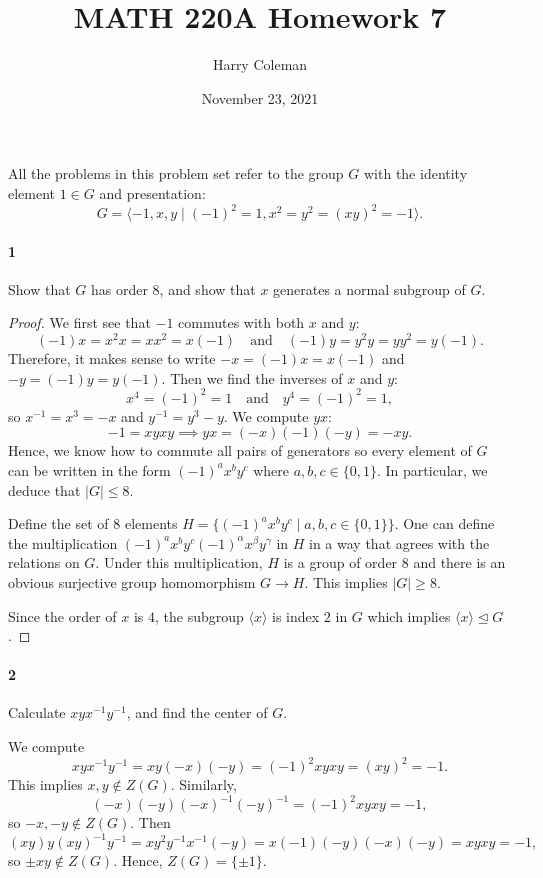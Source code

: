 \documentclass[12pt]{article}
\renewcommand{\maketitle}{\thispagestyle{title}}
\newlength{\myparskip}
\newenvironment{fullbox}{\begin{lrbox}{\savefullbox}\begin{minipage}{\dimexpr\textwidth-2\fboxsep\relax}\setlength{\parskip}{\myparskip}}{\end{minipage}\end{lrbox}\framebox[\textwidth]{\usebox{\savefullbox}}}
\newenvironment{pbox}[1][]{\begin{fullbox}\ifx#1\empty\else\paragraph{#1}\phantom{}\fi}{\end{fullbox}}
\theoremstyle{definition}
\newcommand{\isp}[1]{\quad\text{#1}\quad}
\newcommand{\<}{\langle}
\renewcommand{\>}{\rangle}
\newcommand{\teq}{\trianglelefteq}
\begin{document}
\title{MATH 220A Homework 7}
\author{Harry Coleman\makebox[0pt][r]{\raisebox{-0.25in}[0pt][0pt]{(worked with Joseph Sullivan and Gahl Shemy)}}}
\date{November 23, 2021}
\maketitle

\begin{pbox}
    All the problems in this problem set refer to the group $G$ with the identity element $1 \in G$ and presentation:
    \[
        G = \<-1, x, y \mid (-1)^2 = 1, x^2 = y^2 = (xy)^2 = -1\>.
    \]
\end{pbox}

\begin{pbox}[1]
    Show that $G$ has order $8$, and show that $x$ generates a normal subgroup of $G$.    
\end{pbox}

\begin{proof}
    We first see that $-1$ commutes with both $x$ and $y$:
    \[
        (-1)x= x^2x = xx^2 = x(-1) \isp{and} (-1)y = y^2y = yy^2 = y(-1).
    \]
    Therefore, it makes sense to write $-x = (-1)x = x(-1)$ and $-y = (-1)y = y(-1)$.
    Then we find the inverses of $x$ and $y$:
    \[
        x^4 = (-1)^2 = 1 \isp{and} y^4 = (-1)^2 = 1,
    \]
    so $x^{-1} = x^3 = -x$ and $y^{-1} = y^3 -y$.
    We compute $yx$:
    \[
        -1 = xyxy \implies yx = (-x)(-1)(-y) = -xy.
    \]
    Hence, we know how to commute all pairs of generators so every element of $G$ can be written in the form $(-1)^ax^by^c$ where $a, b, c \in \{0, 1\}$.
    In particular, we deduce that $|G| \leq 8$.

    Define the set of $8$ elements $H = \{(-1)^ax^by^c \mid a, b, c \in \{0, 1\} \}$.
    One can define the multiplication $(-1)^ax^by^c(-1)^\alpha x^\beta y^\gamma$ in $H$ in a way that agrees with the relations on $G$.
    Under this multiplication, $H$ is a group of order $8$ and there is an obvious surjective group homomorphism $G \to H$.
    This implies $|G| \geq 8$.

    Since the order of $x$ is $4$, the subgroup $\<x\>$ is index $2$ in $G$ which implies $\<x\> \teq G$.
\end{proof}

\begin{pbox}[2]
    Calculate $xyx^{-1}y^{-1}$, and find the center of $G$.
\end{pbox}

We compute
\[
    xyx^{-1}y^{-1}
        = xy(-x)(-y)
        = (-1)^2xyxy
        = (xy)^2
        = -1.
\]
This implies $x, y \notin Z(G)$.
Similarly,
\[
    (-x)(-y)(-x)^{-1}(-y)^{-1}
        = (-1)^2xyxy
        = -1,
\]
so $-x, -y \notin Z(G)$.
Then
\[
    (xy)y(xy)^{-1}y^{-1}
        = xy^2y^{-1}x^{-1}(-y)
        = x(-1)(-y)(-x)(-y)
        = xyxy
        = -1,
\]
so $\pm xy \notin Z(G)$.
Hence, $Z(G) = \{\pm 1\}$.
\end{document}
